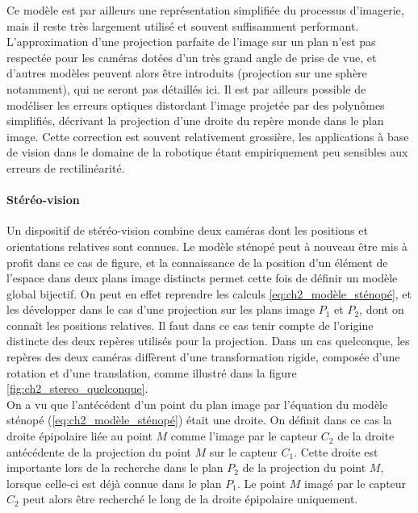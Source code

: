 Ce modèle est par ailleurs une représentation simplifiée du processus d'imagerie, mais il reste très largement utilisé et souvent suffisamment performant. L'approximation d'une projection parfaite de l'image sur un plan n'est pas respectée pour les caméras dotées d'un très grand angle de prise de vue, et d'autres modèles peuvent alors être introduits (projection sur une sphère notamment), qui ne seront pas détaillés ici. Il est par ailleurs possible de modéliser les erreurs optiques distordant l'image projetée par des polynômes simplifiés, décrivant la projection d'une droite du repère monde dans le plan image. Cette correction est souvent relativement grossière, les applications à base de vision dans le domaine de la robotique étant empiriquement peu sensibles aux erreurs de rectilinéarité.

\paragraph{Stéréo-vision\\} \label{sec:ch2_Modèle Stéréovision}
Un dispositif de stéréo-vision combine deux caméras dont les positions et orientations relatives sont connues. Le modèle \og sténopé\fg{} peut à nouveau être mis à profit dans ce cas de figure, et la connaissance de la position d'un élément de l'espace dans deux plans image distincts permet cette fois de définir un modèle global bijectif. On peut en effet reprendre les calculs \ref{eq:ch2_modèle_sténopé}, et les développer dans le cas d'une projection sur les plans image $P_1$ et $P_2$, dont on connaît les positions relatives. Il faut dans ce cas tenir compte de l'origine distincte des deux repères utilisés pour la projection. Dans un cas quelconque, les repères des deux caméras diffèrent d'une transformation rigide, composée d'une rotation et d'une translation, comme illustré dans la figure \ref{fig:ch2_stereo_quelconque}. \\
On a vu que l'antécédent d'un point du plan image par l'équation du modèle sténopé (\ref{eq:ch2_modèle_sténopé}) était une droite. On définit dans ce cas la droite épipolaire liée au point $M$ comme l'image par le capteur $C_2$ de la droite antécédente de la projection du point $M$ sur le capteur $C_1$. Cette droite est importante lors de la recherche dans le plan $P_2$ de la projection du point $M$, lorsque celle-ci est déjà connue dans le plan $P_1$. Le point $M$ imagé par le capteur $C_2$ peut alors être recherché le long de la droite épipolaire uniquement.\\

